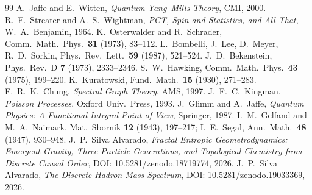 \documentclass[11pt]{article}
\begin{document}
\begin{thebibliography}{99}
 A.~Jaffe and E.~Witten,
  \emph{Quantum Yang--Mills Theory}, CMI, 2000.
 R.~F.~Streater and A.~S.~Wightman,
  \emph{PCT, Spin and Statistics, and All That},
  W.~A.~Benjamin, 1964.
 K.~Osterwalder and R.~Schrader,
  Comm.\ Math.\ Phys.\ \textbf{31} (1973), 83--112.
 L.~Bombelli, J.~Lee, D.~Meyer, R.~D.~Sorkin,
  Phys.\ Rev.\ Lett.\ \textbf{59} (1987), 521--524.
 J.~D.~Bekenstein,
  Phys.\ Rev.\ D \textbf{7} (1973), 2333--2346.
 S.~W.~Hawking,
  Comm.\ Math.\ Phys.\ \textbf{43} (1975), 199--220.
 K.~Kuratowski,
  Fund.\ Math.\ \textbf{15} (1930), 271--283.
 F.~R.~K.~Chung,
  \emph{Spectral Graph Theory}, AMS, 1997.
 J.~F.~C.~Kingman,
  \emph{Poisson Processes}, Oxford Univ.\ Press, 1993.
 J.~Glimm and A.~Jaffe,
  \emph{Quantum Physics: A Functional Integral Point of View},
  Springer, 1987.
 I.~M.~Gelfand and M.~A.~Naimark,
  Mat.\ Sbornik \textbf{12} (1943), 197--217;
  I.~E.~Segal, Ann.\ Math.\ \textbf{48} (1947), 930--948.
 J.~P.~Silva Alvarado,
  \emph{Fractal Entropic Geometrodynamics: Emergent Gravity,
  Three Particle Generations, and Topological Chemistry from
  Discrete Causal Order},
  DOI: 10.5281/zenodo.18719774, 2026.
 J.~P.~Silva Alvarado,
  \emph{The Discrete Hadron Mass Spectrum},
  DOI: 10.5281/zenodo.19033369, 2026.
\end{thebibliography}
\end{document}
